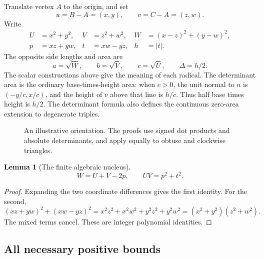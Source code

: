 \documentclass[11pt,a4paper]{article}
\newtheorem{lemma}[theorem]{Lemma}
\theoremstyle{definition}
\newcommand{\abs}[1]{\left|#1\right|}
\numberwithin{equation}{section}
\begin{document}
Translate vertex \(A\) to the origin, and set
\[
 u=B-A=(x,y),\qquad v=C-A=(z,w).
\]
Write
\begin{align}
 U&=x^2+y^2,& V&=z^2+w^2,&
 W&=(x-z)^2+(y-w)^2,\label{eq:uvw}\\
 p&=xz+yw,& t&=xw-yz,& h&=\abs t.\label{eq:pt}
\end{align}
The opposite side lengths and area are
\[
 a=\sqrt W,\qquad b=\sqrt V,\qquad c=\sqrt U,\qquad
 \Delta=h/2.
 \tag{4.3}\label{eq:sides-area}
\]
The scalar constructions above give the meaning of each radical.
The determinant area is the ordinary base-times-height area: when
\(c>0\), the unit normal to \(u\) is \((-y/c,x/c)\), and the height
of \(v\) above that line is \(h/c\). Thus half base times height
is \(h/2\). The determinant formula also defines the continuous
zero-area extension to degenerate triples.

\begin{figure}[ht]
\centering
{}
\caption{An illustrative orientation. The proofs use signed dot products
and absolute determinants, and apply equally to obtuse and clockwise triangles.}
\end{figure}

\begin{lemma}[The finite algebraic nucleus]\label{lem:core}
\[
 W=U+V-2p,\qquad UV=p^2+t^2.
 \tag{4.4}\label{eq:core}
\]
\end{lemma}
\begin{proof}
Expanding the two coordinate differences gives the first identity.
For the second,
\[
 (xz+yw)^2+(xw-yz)^2
 =x^2z^2+x^2w^2+y^2z^2+y^2w^2
 =(x^2+y^2)(z^2+w^2).
\]
The mixed terms cancel. These are integer polynomial identities.
\end{proof}

\subsection{All necessary positive bounds}
\end{document}
